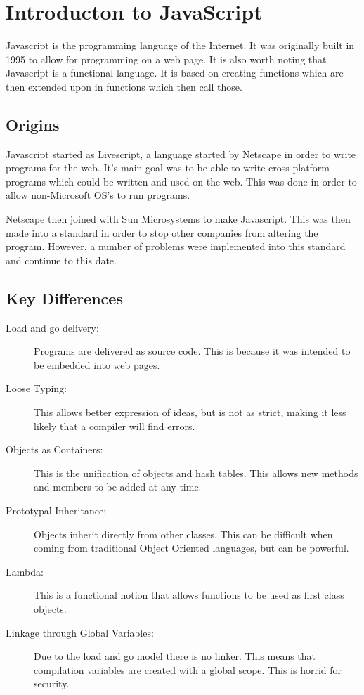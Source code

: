 	\section{Introducton to JavaScript}
		Javascript is the programming language of the Internet. 
		It was originally built in 1995 to allow for programming on a web page. 
		It is also worth noting that Javascript is a functional language\cite{JSProgrammingLanguage}.
		It is based on creating functions which are then extended upon in functions which then call those. 

		\subsection{Origins}
		 
			Javascript started as Livescript, a language started by Netscape in order to write programs for the web. 
			It's main goal was to be able to write cross platform programs which could be written and used on the web. 
			This was done in order to allow non-Microsoft OS's to run programs. 

			Netscape then joined with Sun Microsystems to make Javascript. 
			This was then made into a standard in order to stop other companies from altering the program. 
			However, a number of problems were implemented into this standard and continue to this date. 
		\subsection{Key Differences}
			\begin{description}
				\item[Load and go delivery:] Programs are delivered as source code. 
					This is because it was intended to be embedded into web pages. 
				\item[Loose Typing:] This allows better expression of ideas,
					but is not as strict, making it less likely that a compiler will find errors. 
				\item[Objects as Containers:] This is the unification of objects and hash tables.
					This allows new methods and members to be added at any time. 
				\item[Prototypal Inheritance:] Objects inherit directly from other classes. 
					This can be difficult when coming from traditional Object Oriented languages, but can be powerful. 
				\item[Lambda:] This is a functional notion that allows functions to be used as first class objects. 
				\item[Linkage through Global Variables:] Due to the load and go model there is no linker. 
					This means that compilation variables are created with a global scope. 
					This is horrid for security. 
			\end{description}
